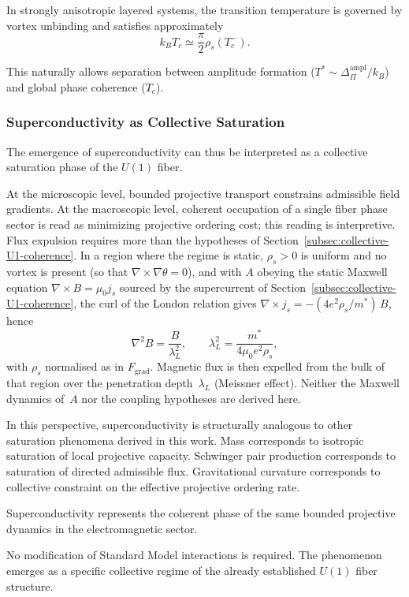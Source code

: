     In strongly anisotropic layered systems, the transition temperature
    is governed by vortex unbinding and satisfies approximately
    \begin{equation}
      k_B T_c \simeq \frac{\pi}{2} \rho_s(T_c^-).
    \end{equation}

    This naturally allows separation between amplitude formation
    ($T^* \sim \Delta_{\Pi}^{\text{ampl}}/k_B$)
    and global phase coherence ($T_c$).

  \subsubsection*{Superconductivity as Collective Saturation}
    \label{subsubsec:sc-collective-saturation}

    The emergence of superconductivity can thus be interpreted as a collective
    saturation phase of the $U(1)$ fiber.

    At the microscopic level, bounded projective transport constrains
    admissible field gradients.
    At the macroscopic level, coherent occupation of a single fiber phase
    sector is read as minimizing projective ordering cost; this reading is
    interpretive.
    Flux expulsion requires more than the hypotheses of
    Section~\ref{subsec:collective-U1-coherence}.
    In a region where the regime is static, $\rho_s > 0$ is uniform and no vortex is present (so that
    $\nabla \times \nabla\theta = 0$), and with $A$ obeying the static Maxwell equation
    $\nabla \times B = \mu_0 j_s$ sourced by the supercurrent of
    Section~\ref{subsec:collective-U1-coherence}, the curl of the London relation gives
    $\nabla \times j_s = -(4e^2\rho_s/m^*)\,B$, hence
    \begin{equation}
      \nabla^2 B = \frac{B}{\lambda_L^2},
      \qquad
      \lambda_L^2 = \frac{m^*}{4\mu_0 e^2 \rho_s},
    \end{equation}
    with $\rho_s$ normalised as in $F_{\text{grad}}$.
    Magnetic flux is then expelled from the bulk of that region over the penetration depth~$\lambda_L$ (Meissner
    effect).
    Neither the Maxwell dynamics of~$A$ nor the coupling hypotheses are derived here.

    In this perspective, superconductivity is structurally analogous to
    other saturation phenomena derived in this work.
    Mass corresponds to isotropic saturation of local projective capacity.
    Schwinger pair production corresponds to saturation of directed admissible flux.
    Gravitational curvature corresponds to collective constraint on the
    effective projective ordering rate.

    Superconductivity represents the coherent phase of the same bounded
    projective dynamics in the electromagnetic sector.

    No modification of Standard Model interactions is required.
    The phenomenon emerges as a specific collective regime of the
    already established $U(1)$ fiber structure.

